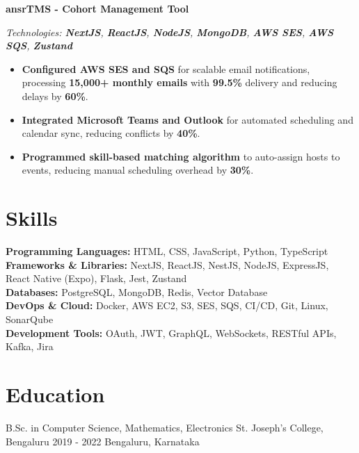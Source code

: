\documentclass[letterpaper]{resume_config}
\begin{document}
\textbf{ansrTMS - Cohort Management Tool}

 \textit{Technologies: \textbf{NextJS}, \textbf{ReactJS}, \textbf{NodeJS}, \textbf{MongoDB}, \textbf{AWS SES}, \textbf{AWS SQS}, \textbf{Zustand}}

\begin{itemize}
    \item \textbf{Configured AWS SES and SQS} for scalable email notifications, processing \textbf{15,000+ monthly emails} with \textbf{99.5\%} delivery and reducing delays by \textbf{60\%}.
    \item \textbf{Integrated Microsoft Teams and Outlook} for automated scheduling and calendar sync, reducing conflicts by \textbf{40\%}.
    \item \textbf{Programmed skill-based matching algorithm} to auto-assign hosts to events, reducing manual scheduling overhead by \textbf{30\%}. 
\end{itemize}


\section{Skills}

\noindent
\textbf{Programming Languages:} HTML, CSS, JavaScript, Python, TypeScript \\
\textbf{Frameworks \& Libraries:} NextJS, ReactJS, NestJS, NodeJS, ExpressJS, React Native (Expo), Flask, Jest, Zustand \\
\textbf{Databases:} PostgreSQL, MongoDB, Redis, Vector Database  \\
\textbf{DevOps \& Cloud:} Docker, AWS EC2, S3, SES, SQS, CI/CD, Git, Linux, SonarQube \\
\textbf{Development Tools:} OAuth, JWT, GraphQL, WebSockets, RESTful APIs, Kafka, Jira \\


\section{Education}

\EducationExperience
    {B.Sc. in Computer Science, Mathematics, Electronics} %
    {St. Joseph's College, Bengaluru} %
    {2019 - 2022} %
    {Bengaluru, Karnataka} %


\end{document}
